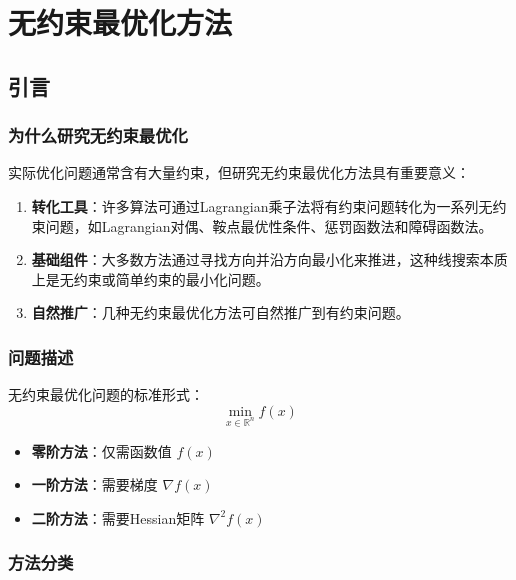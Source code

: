 \chapter{无约束最优化方法}\label{chap:unconstrained}
\section{引言}\label{sec:ch5-intro}

\subsection{为什么研究无约束最优化}

实际优化问题通常含有大量约束，但研究无约束最优化方法具有重要意义：

\begin{enumerate}
    \item \textbf{转化工具}：许多算法可通过Lagrangian乘子法将有约束问题转化为一系列无约束问题，如Lagrangian对偶、鞍点最优性条件、惩罚函数法和障碍函数法。
    
    \item \textbf{基础组件}：大多数方法通过寻找方向并沿方向最小化来推进，这种线搜索本质上是无约束或简单约束的最小化问题。
    
    \item \textbf{自然推广}：几种无约束最优化方法可自然推广到有约束问题。
\end{enumerate}

\subsection{问题描述}

无约束最优化问题的标准形式：
\[
\min_{x \in \mathbb{R}^n} f(x)
\]

\begin{conceptbox}[关键假设]
\begin{itemize}
    \item \textbf{零阶方法}：仅需函数值 $f(x)$
    \item \textbf{一阶方法}：需要梯度 $\nabla f(x)$
    \item \textbf{二阶方法}：需要Hessian矩阵 $\nabla^2 f(x)$
\end{itemize}
\end{conceptbox}

\subsection{方法分类}

